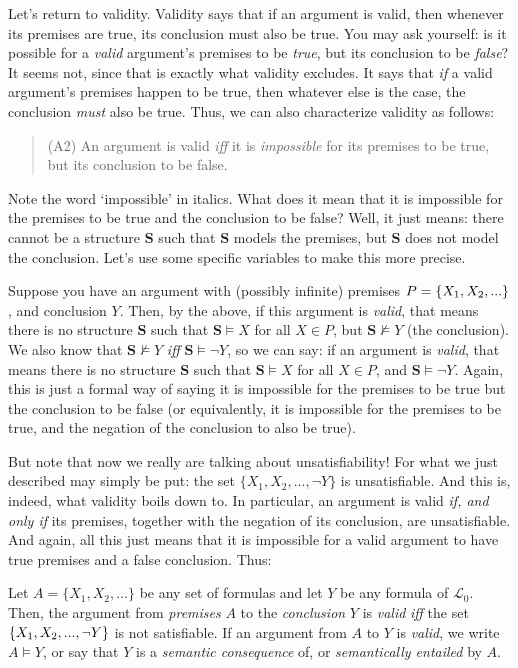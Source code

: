 Let's return to validity. Validity says that if an argument is valid, then whenever its premises are true, its conclusion must also be true. You may ask yourself: is it possible for a \textit{valid} argument's premises to be \textit{true}, but its conclusion to be \textit{false}? It seems not, since that is exactly what validity excludes. It says that \textit{if} a valid argument's premises happen to be true, then whatever else is the case, the conclusion \textit{must} also be true. Thus, we can also characterize validity as follows:

\begin{quote}
(A2) An argument is valid \textit{iff} it is \textit{impossible} for its premises to be true, but its conclusion to be false. 
\end{quote}

Note the word `impossible' in italics. What does it mean that it is impossible for the premises to be true and the conclusion to be false? Well, it just means: there cannot be a structure $\mathbf{S}$ such that $\mathbf{S}$ models the premises, but $\mathbf{S}$ does not model the conclusion. Let's use some specific variables to make this more precise. 

Suppose you have an argument with (possibly infinite) premises $P=\{X_1, X_2, ...\}$, and conclusion $Y$. Then, by the above, if this argument is \textit{valid}, that means there is no structure $\mathbf{S}$ such that $\mathbf{S} \models X$ for all $X \in P$, but $\mathbf{S} \not\models Y$ (the conclusion). We also know that $\mathbf{S} \not\models Y$ \textit{iff} $\mathbf{S} \models \neg Y$, so we can say: if an argument is \textit{valid}, that means there is no structure $\mathbf{S}$ such that $\mathbf{S} \models X$ for all $X \in P$, and $\mathbf{S} \models \neg Y$. Again, this is just a formal way of saying it is impossible for the premises to be true but the conclusion to be false (or equivalently, it is impossible for the premises to be true, and the negation of the conclusion to also be true). 

But note that now we really are talking about unsatisfiability! For what we just described may simply be put: the set $\{X_1, X_2, ..., \neg Y\}$ is unsatisfiable. And this is, indeed, what validity boils down to. In particular, an argument is valid \textit{if, and only if} its premises, together with the negation of its conclusion, are unsatisfiable. And again, all this just means that it is impossible for a valid argument to have true premises and a false conclusion. Thus:

\begin{defn}
Let $A=\{X_1, X_2, ...\}$ be any set of formulas and let $Y$ be any formula of $\mathcal{L}_0$. Then, the argument from \textit{premises} $A$ to the \textit{conclusion} $Y$ is \textit{valid} \textit{iff} the set $\{X_1, X_2, ..., \neg Y\}$ is not satisfiable. If an argument from $A$ to $Y$ is \textit{valid}, we write $A \models Y$, or say that $Y$ is a \textit{semantic consequence} of, or \textit{semantically entailed} by $A$.  
\end{defn}
